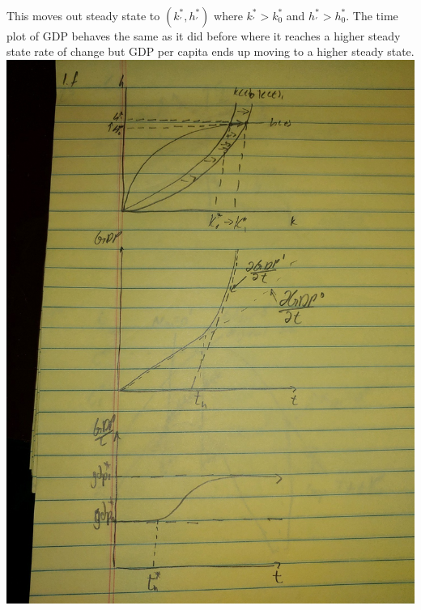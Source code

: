 \documentclass[11pt]{SelfArxOneColBMN}
\begin{document}
\begin{enumerate}
\begin{enumerate}
\begin{solution}
\begin{eqnarray*}
      \end{eqnarray*}
      This moves out steady state to $(k_\prime^*,h_\prime^*)$ where $k_\prime^* > k_0^*$ and $h_\prime^* > h_0^*$. The time plot of GDP behaves the same as it did before where it reaches a higher steady state rate of change but GDP per capita ends up moving to a higher steady state.\\
      \includegraphics[scale=.2]{graph1f.JPG}\\
      \centering
    \end{solution}
  \end{enumerate}


\end{enumerate}
\end{document}
